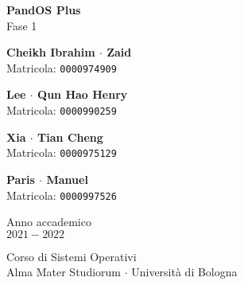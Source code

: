 \documentclass[11pt]{article}
\begin{document}
\graphicspath{ {./img/} }
\begin{titlepage}
    \begin{center}
        \vspace*{1.5cm}
            
        \Huge
        \textbf{PandOS Plus} \\
        \LARGE
        Fase 1
                        
        \vspace{2.0cm}
          
        \begin{minipage}[t]{0.47\textwidth}
        \begin{center}
        	{\large{\bf Cheikh Ibrahim $\cdot$ Zaid}}\\
			{\large Matricola: \texttt{0000974909}}
        \end{center}

		\end{minipage}
		\hfill
		\begin{minipage}[t]{0.47\textwidth}\raggedleft
		\begin{center}
        	{\large{\bf Lee $\cdot$ Qun Hao Henry}}\\
			{\large Matricola: \texttt{0000990259}}
        \end{center}
		\end{minipage}

        \vspace{1cm}

        \begin{minipage}[t]{0.47\textwidth}
            \begin{center}
                {\large{\bf Xia $\cdot$ Tian Cheng}}\\
                {\large Matricola: \texttt{0000975129}}
            \end{center}
    
            \end{minipage}
            \hfill
            \begin{minipage}[t]{0.47\textwidth}\raggedleft
            \begin{center}
                {\large{\bf Paris $\cdot$ Manuel}}\\
                {\large Matricola: \texttt{0000997526}}
            \end{center}
            \end{minipage}  
            
        \vspace{6cm}
            
        Anno	 accademico\\
        $2021 - 2022$
            
        \vspace{0.8cm}
            
            
        \Large
        Corso di Sistemi Operativi\\
        Alma Mater Studiorum $\cdot$ Università di Bologna\\
            
    \end{center}
\end{titlepage}
\pagebreak
\end{document}
